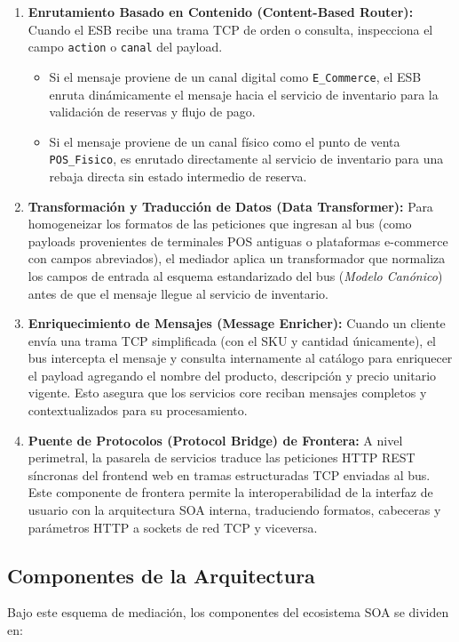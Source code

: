 \documentclass[12pt,a4paper]{article}
\begin{document}
\begin{enumerate}
    \item \textbf{Enrutamiento Basado en Contenido (Content-Based Router):} Cuando el ESB recibe una trama TCP de orden o consulta, inspecciona el campo \texttt{action} o \texttt{canal} del payload. 
    \begin{itemize}
        \item Si el mensaje proviene de un canal digital como \texttt{E\_Commerce}, el ESB enruta dinámicamente el mensaje hacia el servicio de inventario para la validación de reservas y flujo de pago.
        \item Si el mensaje proviene de un canal físico como el punto de venta \texttt{POS\_Fisico}, es enrutado directamente al servicio de inventario para una rebaja directa sin estado intermedio de reserva.
    \end{itemize}
    
    \item \textbf{Transformación y Traducción de Datos (Data Transformer):} Para homogeneizar los formatos de las peticiones que ingresan al bus (como payloads provenientes de terminales POS antiguas o plataformas e-commerce con campos abreviados), el mediador aplica un transformador que normaliza los campos de entrada al esquema estandarizado del bus (\textit{Modelo Canónico}) antes de que el mensaje llegue al servicio de inventario.
    
    \item \textbf{Enriquecimiento de Mensajes (Message Enricher):} Cuando un cliente envía una trama TCP simplificada (con el SKU y cantidad únicamente), el bus intercepta el mensaje y consulta internamente al catálogo para enriquecer el payload agregando el nombre del producto, descripción y precio unitario vigente. Esto asegura que los servicios core reciban mensajes completos y contextualizados para su procesamiento.
    
    \item \textbf{Puente de Protocolos (Protocol Bridge) de Frontera:} A nivel perimetral, la pasarela de servicios traduce las peticiones HTTP REST síncronas del frontend web en tramas estructuradas TCP enviadas al bus. Este componente de frontera permite la interoperabilidad de la interfaz de usuario con la arquitectura SOA interna, traduciendo formatos, cabeceras y parámetros HTTP a sockets de red TCP y viceversa.
\end{enumerate}

\subsection{Componentes de la Arquitectura}
Bajo este esquema de mediación, los componentes del ecosistema SOA se dividen en:
\end{document}
